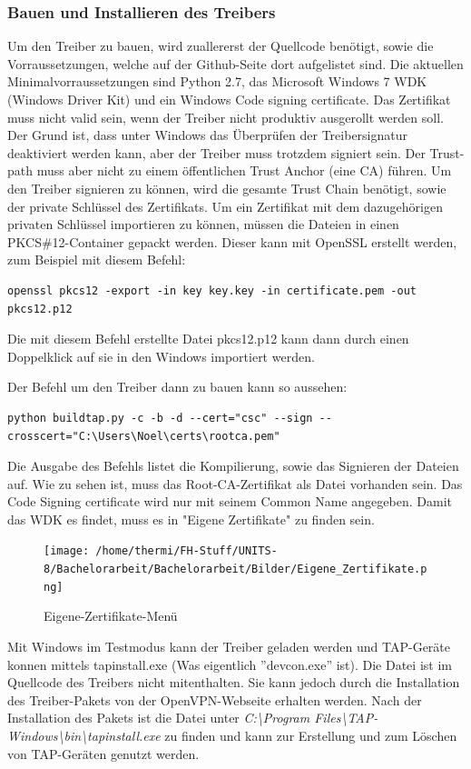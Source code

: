\subsubsection{Bauen und Installieren des Treibers}
Um den Treiber zu bauen, wird zuallererst der Quellcode benötigt, sowie die
Vorraussetzungen, welche auf der Github-Seite dort aufgelistet sind.
Die aktuellen Minimalvorraussetzungen sind Python 2.7, das Microsoft Windows 7 WDK (Windows Driver Kit)
und ein Windows Code signing certificate.
Das Zertifikat muss nicht valid sein, wenn der Treiber nicht produktiv ausgerollt
werden soll. Der Grund ist, dass unter Windows das Überprüfen der Treibersignatur deaktiviert
werden kann, aber der Treiber muss trotzdem signiert sein. Der Trust-path muss aber nicht
zu einem öffentlichen Trust Anchor (eine CA) führen. Um den Treiber signieren zu können,
wird die gesamte Trust Chain benötigt, sowie der private Schlüssel des Zertifikats.
Um ein Zertifikat mit dem dazugehörigen privaten Schlüssel importieren zu können,
müssen die Dateien in einen PKCS\#12-Container gepackt werden. Dieser kann mit 
OpenSSL erstellt werden, zum Beispiel mit diesem Befehl:
\begin{lstlisting}[caption=OpenSSL PKCS\#12]
openssl pkcs12 -export -in key key.key -in certificate.pem -out pkcs12.p12
\end{lstlisting}
Die mit diesem Befehl erstellte Datei pkcs12.p12 kann dann durch einen Doppelklick auf sie
in den Windows importiert werden.

Der Befehl um den Treiber dann zu bauen kann so aussehen:
\begin{lstlisting}[caption=TAP-Windows bauen]
python buildtap.py -c -b -d --cert="csc" --sign --crosscert="C:\Users\Noel\certs\rootca.pem"
\end{lstlisting}
Die Ausgabe des Befehls listet die Kompilierung, sowie das Signieren der Dateien auf.
Wie zu sehen ist, muss das Root-CA-Zertifikat als Datei vorhanden sein.
Das Code Signing certificate wird nur mit seinem Common Name angegeben.
Damit das WDK es findet, muss es in "Eigene Zertifikate" zu finden sein.
\begin{figure}
\texttt{[image: /home/thermi/FH-Stuff/UNITS-8/Bachelorarbeit/Bachelorarbeit/Bilder/Eigene\_Zertifikate.png]}
\caption{Eigene-Zertifikate-Menü}
\label{fig:Eigene-Zertifikate-Menue}
\end{figure}

Mit Windows im Testmodus kann der Treiber geladen werden und TAP-Geräte konnen
mittels tapinstall.exe (Was eigentlich ''devcon.exe'' ist). Die Datei ist im Quellcode des
Treibers nicht mitenthalten. Sie kann jedoch durch die Installation des Treiber-Pakets
von der OpenVPN-Webseite erhalten werden. Nach der Installation des Pakets
ist die Datei unter \textit{C:\textbackslash{}Program Files\textbackslash{}TAP-Windows\textbackslash{}bin\textbackslash{}tapinstall.exe}
zu finden und kann zur Erstellung und zum Löschen von TAP-Geräten genutzt werden.

